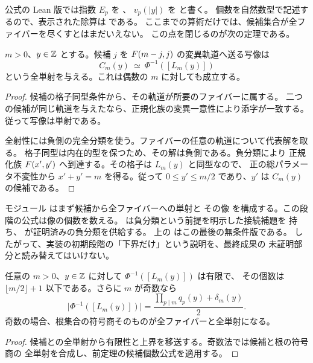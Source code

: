公式の Lean 版では指数 $E_p$ を 、
$v_p(|y|)$ を  と書く。
個数を自然数型で記述するので、表示された除算は  である。
ここまでの算術だけでは、候補集合が全ファイバーを尽くすとはまだいえない。
この点を閉じるのが次の定理である。

\begin{theorem}[候補から全ファイバーへの全単射]
\label{bp:fiber-completion}
\leanok
{}
$m>0$、$y\in\mathbb Z$ とする。候補 $j$ を $F(m-j,j)$ の変異軌道へ送る写像は
\[
 C_m(y)\ \simeq\ \Phi^{-1}([L_m(y)])
\]
という全単射を与える。これは偶数の $m$ に対しても成立する。
\end{theorem}
\begin{proof}
\leanok
候補の格子同型条件から、その軌道が所要のファイバーに属する。
二つの候補が同じ軌道を与えたなら、正規化族の変異一意性により添字が一致する。
従って写像は単射である。

全射性には負側の完全分類を使う。ファイバーの任意の軌道について代表解を取る。
格子同型は内在的型を保つため、その解は負側である。負分類により
正規化族 $F(x',y')$ へ到達する。その格子は $L_m(y)$ と同型なので、
正の総パラメータ不変性から $x'+y'=m$ を得る。従って
$0\le y'\le m/2$ であり、$y'$ は $C_m(y)$ の候補である。
\end{proof}

モジュール  はまず候補から全ファイバーへの単射と
その像  を構成する。この段階の公式は像の個数を数える。
 は負分類という前提を明示した接続補題を
持ち、 が証明済みの負分類を供給する。
上の  はこの最後の無条件版である。
したがって、実装の初期段階の「下界だけ」という説明を、最終成果の
未証明部分と読み替えてはいけない。

\begin{theorem}[全負側ファイバーの厳密な個数]
\label{bp:fiber-full-formula}
\leanok
{}
任意の $m>0$、$y\in\mathbb Z$ に対して $\Phi^{-1}([L_m(y)])$ は有限で、
その個数は $\lfloor m/2\rfloor+1$ 以下である。さらに $m$ が奇数なら
\[
 \bigl|\Phi^{-1}([L_m(y)])\bigr|
 =\frac{\prod_{p\mid m}q_p(y)+\delta_m(y)}2.
\]
奇数の場合、根集合の符号商そのものが全ファイバーと全単射になる。
\end{theorem}
\begin{proof}
\leanok
候補との全単射から有限性と上界を移送する。奇数法では候補と根の符号商の
全単射を合成し、前定理の候補個数公式を適用する。
\end{proof}

